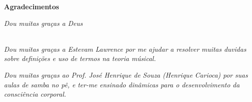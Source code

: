 \cleardoublepage

\begin{center}
\Huge{\textbf{Agradecimentos}}
\end{center}

\null
\vfill
\thispagestyle{empty}

{\normalsize \it \hfill Dou muitas graças a Deus \vspace*{4pt}}


~\\

{\normalsize \it Dou muitas graças a Estevam Lawrence por me 
ajudar a resolver muitas duvidas sobre definições e uso de termos na teoria músical.
\vspace*{4pt}}


{\normalsize \it Dou muitas graças ao Prof. José Henrique de Souza (Henrique Carioca)
por suas aulas de samba no pê, 
e ter-me ensinado dinâmicas para o desenvolvimento da consciência corporal.
\vspace*{4pt}}

\begin{comment}
{\normalsize \it Dou muitas graças a \textcolor{red}{XXXXXXXXXXX} pela 
suas sugestões e revisão  do capitulo \textcolor{red}{XXXXXXXXXXX}.
\vspace*{4pt}}
\end{comment}


